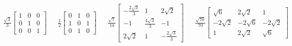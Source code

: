 \documentclass[prd,preprintnumbers,floatfix,
nofootinbib,superscriptaddress]{revtex4}
\begin{document}
\begin{itemize}
\begin{align*}
  \frac{\sqrt{3}}{3}
  \left[\begin{matrix}1 & 0 & 0\\0 & 1 & 0\\0 & 0 & 1\end{matrix}\right]&&
  \frac{1}{2}
  \left[\begin{matrix}0 & 1 & 0\\1 & 0 & 1\\0 & 1 & 0\end{matrix}\right]&&
  \frac{\sqrt{7}}{14}
  \left[\begin{matrix}- \frac{2 \sqrt{3}}{3} & 1 & 2 \sqrt{2}\\-1 & \frac{4 \sqrt{3}}{3} & -1\\2 \sqrt{2} & 1 & - \frac{2 \sqrt{3}}{3}\end{matrix}\right]&&
  \frac{\sqrt{70}}{70}
  \left[\begin{matrix}\sqrt{6} & 2 \sqrt{2} & 1\\- 2 \sqrt{2} & - 2 \sqrt{6} & - 2 \sqrt{2}\\1 & 2 \sqrt{2} & \sqrt{6}\end{matrix}\right]
\end{align*}
\end{itemize}
\end{document}
